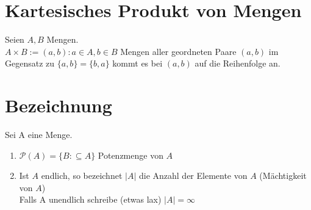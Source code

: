 \section{Kartesisches Produkt von Mengen}
Seien $A, B$ Mengen.\\
$A \times B := {(a, b): a \in A, b\in B}$ Mengen aller geordneten Paare $(a,b)$ im Gegensatz zu $\{a, b\} = \{b,a\}$ kommt es bei $(a, b)$ auf die Reihenfolge an.
\section{Bezeichnung}
Sei A eine Menge.
\begin{enumerate}
\item $\mathcal{P}(A) =\{B: \subseteq A\}$ Potenzmenge von $A$
\item Ist $A$ endlich, so bezeichnet $\vert A \vert$ die Anzahl der Elemente von $A$ (Mächtigkeit von $A$)\\
Falls A unendlich schreibe (etwas lax) $\vert A \vert = \infty$
\end{enumerate}